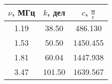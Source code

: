 \begin{tabular}{ccc}
\toprule
$\nu$, МГц & $k$, дел & $c$, $\frac{\text{м}}{\text{с}}$ \\
\midrule
1.19 & 38.50	&486.130  \\
1.53 & 50.50	&1450.455 \\
1.81 & 60.04	&1447.938 \\
3.47 & 101.50	&1639.567 \\
\bottomrule
\end{tabular}
